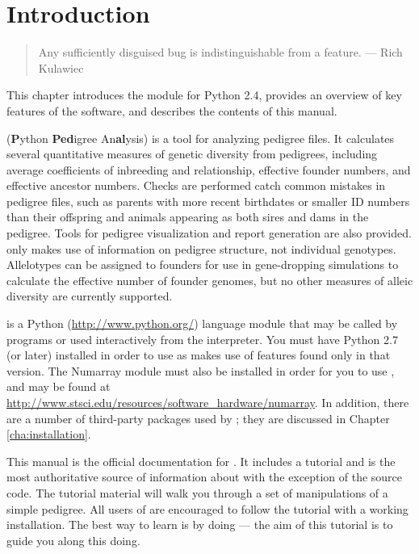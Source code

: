 \chapter{Introduction}
\label{cha:introduction}

\begin{quote}
Any sufficiently disguised bug is indistinguishable from a feature. --- Rich Kulawiec
\end{quote}
This chapter introduces the \PyPedal{} module for Python 2.4, provides an overview of key features of the software, and describes the contents of this manual.

\PyPedal{} (\textbf{P}ython \textbf{Ped}igree An\textbf{al}ysis) is a tool for analyzing pedigree files.  It calculates several quantitative measures of genetic diversity from pedigrees, including average coefficients of inbreeding and relationship, effective founder numbers, and effective ancestor numbers.  Checks are performed catch common mistakes in pedigree files, such as parents with more recent birthdates or smaller ID numbers than their offspring and animals appearing as both sires and dams in the pedigree.  Tools for pedigree visualization and report generation are also provided.  \PyPedal{} only makes use of information on pedigree structure, not individual genotypes.  Allelotypes can be assigned to founders for use in gene-dropping simulations to calculate the effective number of founder genomes, but no other measures of alleic diversity are currently supported.

\PyPedal{} is a Python (\url{http://www.python.org/}) language module that may be called by programs or used interactively from the interpreter.  You must have Python 2.7 (or later) installed in order to use \PyPedal{} as \PyPedal{} makes use of features found only in that version.  The Numarray module must also be installed in order for you to use \PyPedal{}, and may be found at \url{http://www.stsci.edu/resources/software_hardware/numarray}.  In addition, there are a number of third-party packages used by \PyPedal{}; they are discussed in Chapter \ref{cha:installation}.

This manual is the official documentation for \PyPedal{}. It includes a tutorial and is the most authoritative source of information about \PyPedal{} with the exception of the source code. The tutorial material will walk you through a set of manipulations of a simple pedigree.  All users of \PyPedal{} are encouraged to follow the tutorial with a working \PyPedal{} installation. The best way to learn is by doing --- the aim of this tutorial is to guide you along this doing.

